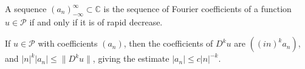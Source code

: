 A sequence $(a_n)_{-\infty}^{\infty} \subset \mathbb{C}$ is the sequence of Fourier coefficients of a function $u \in \mathcal{P}$ if and only if it is of rapid decrease.

If $u \in \mathcal{P}$ with coefficients $(a_n)$, then the coefficients of $D^k u$ are $((in)^k a_n)$, and $|n|^k |a_n| \leq \|D^k u\|$, giving the estimate $|a_n| \leq c|n|^{-k}$.
